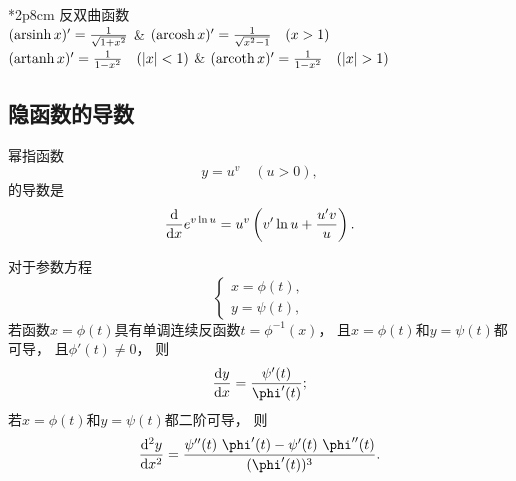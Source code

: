 \begin{table}[htb]
	\centering
	\begin{tblr}{*2{p{8cm}}}
		反双曲函数 \\ \hline
		\((\operatorname{arsinh} x)' = \frac1{\sqrt{1 + x^2}}\)
		& \((\operatorname{arcosh} x)' = \frac1{\sqrt{x^2 - 1}} \quad (x > 1)\) \\
		\((\operatorname{artanh} x)' = \frac1{1 - x^2} \quad(\abs{x}<1)\)
		& \((\operatorname{arcoth} x)' = \frac1{1-x^2} \quad(\abs{x}>1)\) \\
	\end{tblr}
\end{table}

\clearpage
\subsection*{隐函数的导数}
幂指函数\begin{equation*}
	y = u^v
	\quad(u > 0),
\end{equation*}的导数是\begin{equation*}
	\dv{x} e^{v \ln u}
	= u^v \left( v' \ln u + \frac{u'v}{u} \right).
\end{equation*}

对于参数方程\begin{equation*}
	\left\{ \begin{array}{l}
		x = \phi(t), \\
		y = \psi(t),
	\end{array} \right.
\end{equation*}
若函数\(x = \phi(t)\)具有单调连续反函数\(t=\phi^{-1}(x)\)，
且\(x = \phi(t)\)和\(y = \psi(t)\)都可导，
且\(\phi'(t) \neq 0\)，
则\begin{equation*}
	\dv{y}{x}
	= \frac{\psi'(t)}{\phi'(t)};
\end{equation*}
若\(x = \phi(t)\)和\(y = \psi(t)\)都二阶可导，
则\begin{equation*}
	\dv[2]{y}{x}
	= \frac{\psi''(t)~\phi'(t) - \psi'(t)~\phi''(t)}{(\phi'(t))^3}.
\end{equation*}
